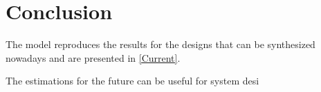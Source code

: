 \section{Conclusion}

The model reproduces the results for the designs that can be synthesized nowadays and are presented in \ref{Current}. 

The estimations for the future can be useful for system desi




%
